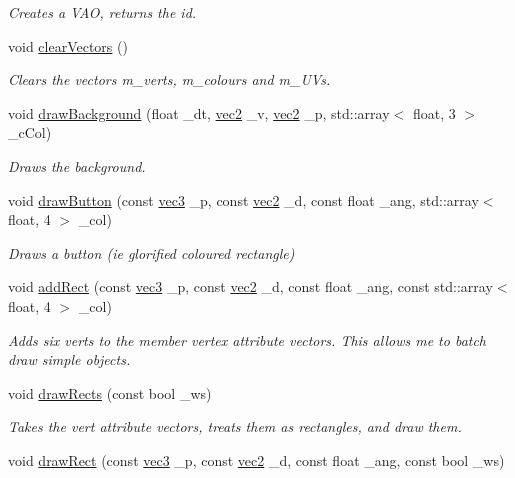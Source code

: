 \begin{DoxyCompactItemize}
\begin{DoxyCompactList}\small\item\em Creates a V\-A\-O, returns the id. \end{DoxyCompactList}\item 
void \hyperlink{classrenderer__ngl_a65697ddd91050e11eac943df3f363374}{clear\-Vectors} ()
\begin{DoxyCompactList}\small\item\em Clears the vectors m\-\_\-verts, m\-\_\-colours and m\-\_\-\-U\-Vs. \end{DoxyCompactList}\item 
void \hyperlink{classrenderer__ngl_a94df23320b9273397a468f14dcbece0d}{draw\-Background} (float \-\_\-dt, \hyperlink{structvec2}{vec2} \-\_\-v, \hyperlink{structvec2}{vec2} \-\_\-p, std\-::array$<$ float, 3 $>$ \-\_\-c\-Col)
\begin{DoxyCompactList}\small\item\em Draws the background. \end{DoxyCompactList}\item 
void \hyperlink{classrenderer__ngl_abfbfd39558f07ef49e3e95c8e3b59914}{draw\-Button} (const \hyperlink{structvec3}{vec3} \-\_\-p, const \hyperlink{structvec2}{vec2} \-\_\-d, const float \-\_\-ang, std\-::array$<$ float, 4 $>$ \-\_\-col)
\begin{DoxyCompactList}\small\item\em Draws a button (ie glorified coloured rectangle) \end{DoxyCompactList}\item 
void \hyperlink{classrenderer__ngl_ad59d37f1adc3ac09e3c510733e77bf6d}{add\-Rect} (const \hyperlink{structvec3}{vec3} \-\_\-p, const \hyperlink{structvec2}{vec2} \-\_\-d, const float \-\_\-ang, const std\-::array$<$ float, 4 $>$ \-\_\-col)
\begin{DoxyCompactList}\small\item\em Adds six verts to the member vertex attribute vectors. This allows me to batch draw simple objects. \end{DoxyCompactList}\item 
void \hyperlink{classrenderer__ngl_a98313f3934c11a90f72defdf2a18fc73}{draw\-Rects} (const bool \-\_\-ws)
\begin{DoxyCompactList}\small\item\em Takes the vert attribute vectors, treats them as rectangles, and draw them. \end{DoxyCompactList}\item 
void \hyperlink{classrenderer__ngl_a8788a0ac1282ae3cd243396fc54948bd}{draw\-Rect} (const \hyperlink{structvec3}{vec3} \-\_\-p, const \hyperlink{structvec2}{vec2} \-\_\-d, const float \-\_\-ang, const bool \-\_\-ws)

\end{DoxyCompactItemize}
